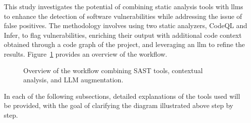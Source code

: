This study investigates the potential of combining static analysis tools with \aclp{llm} to enhance the detection of software vulnerabilities while addressing the issue of false positives. 
The methodology involves using two static analyzers, CodeQL and Infer, to flag vulnerabilities, enriching their output with additional code context obtained through a code graph of the project, and leveraging an \ac{llm} to refine the results. 
Figure~\ref{workflow} provides an overview of the workflow.

\begin{figure}[H]
    \centering
    \caption{Overview of the workflow combining SAST tools, contextual analysis, and LLM augmentation.}
    \label{workflow}
\end{figure}

In each of the following subsections, detailed explanations of the tools used will be provided, with the goal of clarifying the diagram illustrated above step by step.